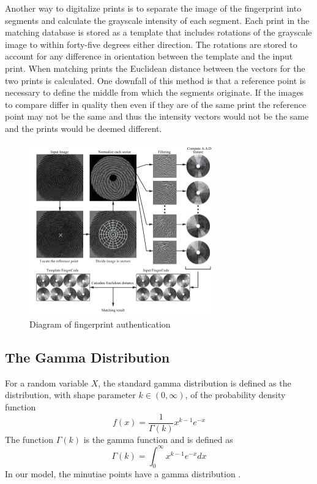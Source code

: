 \documentclass[a4paper]{article}
\begin{document}
Another way to digitalize prints is to separate the image of the fingerprint into segments and calculate the grayscale intensity of each segment. Each print in the matching database is stored as a template that includes rotations of the grayscale image to within forty-five degrees either direction. The rotations are stored to account for any difference in orientation between the template and the input print.  When matching prints the Euclidean distance between the vectors for the two prints is calculated. One downfall of this method is that a reference point is necessary to define the middle from which the segments originate. If the images to compare differ in quality then even if they are of the same print the reference point may not be the same and thus the intensity vectors would not be the same and the prints would be deemed different. \cite{prabhakar}
\begin{figure}
\centering
\includegraphics[width=8cm]{Algorithm.PNG}
\caption{Diagram of fingerprint authentication}
\label{fig:algorithm}
\end{figure}

\subsection{The Gamma Distribution}

For a random variable $X$, the standard gamma distribution is defined as the distribution, with shape parameter $k \in (0, \infty)$, of the probability density function $$f(x) = \frac{1}{\Gamma(k)} x^{k-1} e^{-x}$$ The function $\Gamma(k)$ is the gamma function and is defined as $$\Gamma(k) = \int_0^\infty x^{k-1} e^{-x} dx$$
In our model, the minutiae points have a gamma distribution \cite{gammadist}.
\end{document}
